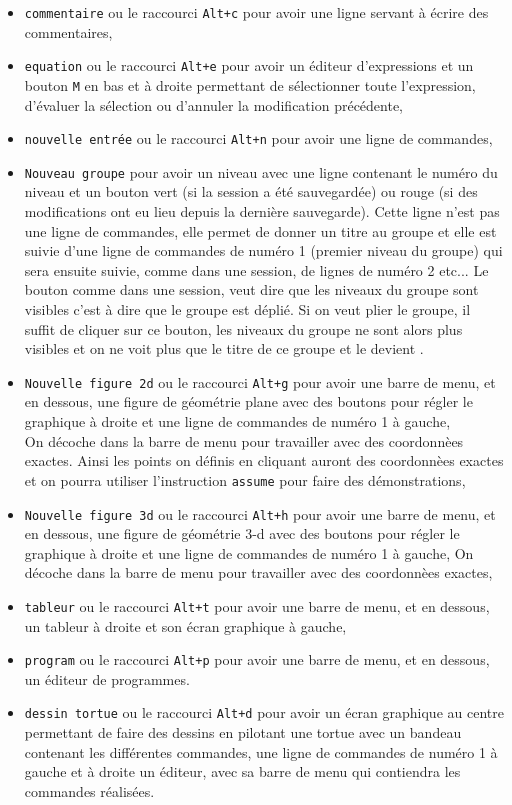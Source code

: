 \documentclass[a4paper,11pt]{article}
\begin{document}
\begin{itemize}
\item {\tt commentaire} ou le raccourci {\tt Alt+c} pour avoir une ligne 
servant \`a \'ecrire des commentaires,
\item {\tt equation} ou le raccourci {\tt Alt+e} pour avoir un \'editeur 
d'expressions et un bouton {\tt M}  en bas et \`a droite 
permettant de s\'electionner toute l'expression, d'\'evaluer la s\'election ou 
d'annuler la modification pr\'ec\'edente,
\item {\tt nouvelle entr\'ee}  ou le raccourci {\tt Alt+n} pour avoir une ligne
de commandes, 
\item {\tt Nouveau groupe} pour avoir un niveau avec une ligne contenant le num\'ero du niveau et un bouton \framebox{\tt -}  vert (si la session a \'et\'e 
sauvegard\'ee) ou rouge (si des modifications ont eu lieu depuis la derni\`ere 
sauvegarde). Cette ligne n'est pas une ligne de commandes, elle permet de 
donner un titre au groupe et elle est suivie d'une ligne de commandes de 
num\'ero 1 (premier niveau du groupe) qui sera ensuite suivie, comme dans une 
session, de lignes de num\'ero 2 etc...
Le bouton \framebox{\tt -} comme dans une session, veut dire que les niveaux du
groupe sont visibles c'est \`a dire que le groupe est d\'epli\'e. Si on veut 
plier le groupe, il suffit de cliquer sur ce bouton, les niveaux du groupe ne 
sont alors plus visibles et on ne voit plus que le titre de ce groupe et le \framebox{\tt -} devient \framebox{\tt +}.
\item {\tt Nouvelle figure 2d} ou le raccourci {\tt Alt+g} pour avoir une barre
de menu, et en dessous, une figure de g\'eom\'etrie plane avec des boutons pour
r\'egler le graphique \`a droite et une ligne de commandes de num\'ero 1 \`a 
gauche,\\
On d\'ecoche \framebox{$\sim$} dans la barre de menu pour travailler avec des
coordonn\`ees exactes. Ainsi les points on d\'efinis en cliquant auront des 
coordonn\`ees exactes et on pourra utiliser l'instruction {\tt assume} pour 
faire des d\'emonstrations,
\item {\tt Nouvelle figure 3d} ou le raccourci {\tt Alt+h} pour avoir une barre
de menu, et 
en dessous, une figure de g\'eom\'etrie 3-d avec des boutons pour r\'egler le 
graphique \`a droite et une ligne de commandes de num\'ero 1 \`a gauche,
On d\'ecoche \framebox{$\sim$} dans la barre de menu pour travailler avec des
coordonn\`ees exactes, 
\item {\tt tableur} ou le raccourci {\tt Alt+t} pour avoir une barre de menu, 
et en dessous, un tableur \`a droite  et son \'ecran graphique \`a gauche,
\item{\tt program} ou le raccourci {\tt Alt+p} pour avoir une 
barre de menu, et en dessous, un \'editeur de programmes.
\item {\tt dessin tortue}  ou le raccourci {\tt Alt+d} pour avoir un \'ecran
graphique au centre permettant de faire des dessins en pilotant une tortue
avec un bandeau contenant les diff\'erentes commandes, une ligne de commandes 
de num\'ero 1 \`a gauche et \`a droite un \'editeur, avec
sa barre de menu qui contiendra les commandes r\'ealis\'ees.
\end{itemize}
\end{document}
